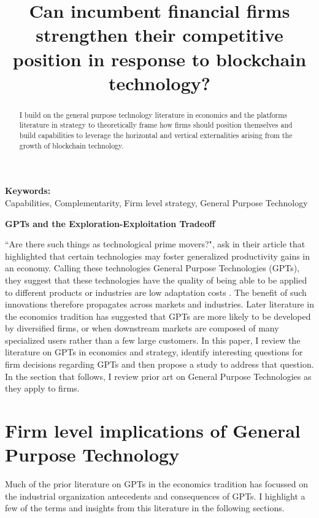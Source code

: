\documentclass[12pt,letterpaper]{article}
\begin{document}
\title{Can incumbent financial firms strengthen their competitive position in response to blockchain technology?}
\date{\vspace{-10ex}}
\maketitle
\thispagestyle{empty}
\renewcommand{\abstractname}{\normalsize ABSTRACT}
\begin{abstract} 
\normalsize 
I build on the general purpose technology literature in economics and the platforms literature in strategy to theoretically frame how firms should position themselves and build capabilities to leverage the horizontal and vertical externalities arising from the growth of blockchain technology.
\end{abstract}


{\textbf{Keywords:} \\\indent Capabilities, Complementarity, Firm level strategy, General Purpose Technology}

\pagestyle{fancy}
\fancyhf{}
\rhead{\thepage}

\begin{center}
\textbf{GPTs and the Exploration-Exploitation Tradeoff}
\end{center}
``Are there such things as \textquotesingle technological prime movers\textquotesingle ?", ask \cite{Bresnahan1995} in their article that highlighted that certain technologies may foster generalized productivity gains in an economy. Calling these technologies General Purpose Technologies (GPTs), they suggest that these technologies have the quality of being able to be applied to different products or industries are low adaptation costs \citep{Rosenberg2004}. The benefit of such innovations therefore propagates across markets and industries. Later literature in the economics tradition has suggested that GPTs are more likely to be developed by diversified firms, or when downstream markets are composed of many specialized users rather than a few large customers.  In this paper, I review the literature on GPTs in economics and strategy, identify interesting questions for firm decisions regarding GPTs and then propose a study to address that question. In the section that follows, I review prior art on General Purpose Technologies as they apply to firms.

\section{Firm level implications of General Purpose Technology}
Much of the prior literature on GPTs in the economics tradition has focussed on the industrial organization antecedents and consequences of GPTs. I highlight a few of the terms and insights from this literature in the following sections.
\end{document}
